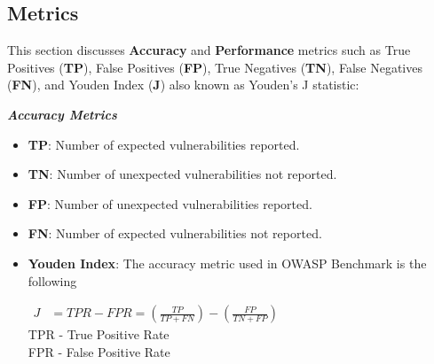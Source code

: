 \subsection{Metrics}\label{section:metrics}


This section discusses \textbf{Accuracy} and \textbf{Performance} metrics such as True Positives (\textbf{TP}), False Positives (\textbf{FP}), True Negatives (\textbf{TN}), False Negatives (\textbf{FN}), and Youden Index (\textbf{J}) also known as Youden's J statistic:

\par\noindent\textbf{\textit{Accuracy Metrics}}
\begin{itemize}
    \item \textbf{TP}: Number of expected vulnerabilities reported.
    \item \textbf{TN}: Number of unexpected vulnerabilities not reported.
    \item \textbf{FP}: Number of unexpected vulnerabilities reported.
    \item \textbf{FN}: Number of expected vulnerabilities not reported.
    \item \textbf{Youden Index}: The accuracy metric used in OWASP Benchmark \cite{owasp_benchmark_scoring} is the following\\ 
    \begin{minipage}{0.6\textwidth}
    \raggedright
    $
      \begin{aligned}
        J & = TPR - FPR = (\frac{TP}{TP+FN}) - (\frac{FP}{TN+FP})
      \end{aligned}
    $\\
    \vspace{1em}
    \footnotesize{TPR - True Positive Rate}\\
    \footnotesize{FPR - False Positive Rate}\\
    \vspace{1em}
    \end{minipage}
\end{itemize}

